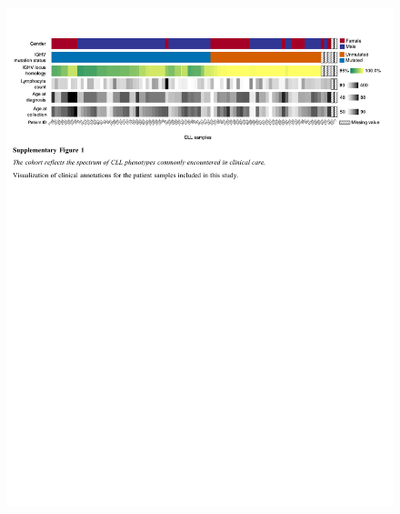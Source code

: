 \documentclass[10pt,]{article}
\begin{document}
\begin{figure}
\centering
\includegraphics[width=1.000\hsize]{figures/Supplementary_Information_01.pdf}
\end{figure}
\clearpage
\end{document}

